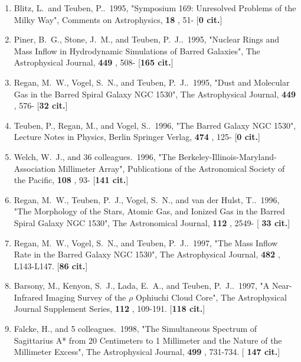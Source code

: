 \documentclass[11pt,letterpaper]{article}
\begin{document}
\begin{enumerate}[resume,label=\textbf{\arabic*}.]
\item  
Blitz, L.~and Teuben, P..\  1995,  "Symposium 169: Unresolved Problems of 
the Milky Way", Comments on Astrophysics,  {\bf 18} , 51- [{\bf 0 cit.}] 

\item  
Piner, B.~G., Stone, J.~M., and Teuben, P.~J..\  1995,  "Nuclear Rings and 
Mass Inflow in Hydrodynamic Simulations of Barred Galaxies", The 
Astrophysical Journal,  {\bf 449} , 508- [{\bf 165 cit.}] 

\item  
Regan, M.~W., Vogel, S.~N., and Teuben, P.~J..\  1995,  "Dust and Molecular 
Gas in the Barred Spiral Galaxy NGC 1530", The Astrophysical Journal,  {\bf 
449} , 576- [{\bf 32 cit.}] 

\item  
Teuben, P., Regan, M., and Vogel, S..\  1996,  "The Barred Galaxy NGC 
1530", Lecture Notes in Physics, Berlin Springer Verlag,  {\bf 474} , 125- 
[{\bf 0 cit.}] 

\item  
Welch, W.~J., and 36 colleagues.\  1996,  "The 
Berkeley-Illinois-Maryland-Association Millimeter Array", Publications of 
the Astronomical Society of the Pacific,  {\bf 108} , 93- [{\bf 141 cit.}] 

\item  
Regan, M.~W., Teuben, P.~J., Vogel, S.~N., and van der Hulst, T..\  1996,  
"The Morphology of the Stars, Atomic Gas, and Ionized Gas in the Barred 
Spiral Galaxy NGC 1530", The Astronomical Journal,  {\bf 112} , 2549- [{\bf 
33 cit.}] 

\item  
Regan, M.~W., Vogel, S.~N., and Teuben, P.~J..\  1997,  "The Mass Inflow 
Rate in the Barred Galaxy NGC 1530", The Astrophysical Journal,  {\bf 482} 
, L143-L147.  [{\bf 86 cit.}] 


\item  
Barsony, M., Kenyon, S.~J., Lada, E.~A., and Teuben, P.~J..\  1997,  "A 
Near-Infrared Imaging Survey of the {$\rho$} Ophiuchi Cloud Core", The 
Astrophysical Journal Supplement Series,  {\bf 112} , 109-191.  [{\bf 118 
cit.}] 

\item  
Falcke, H., and 5 colleagues.\  1998,  "The Simultaneous Spectrum of 
Sagittarius A* from 20 Centimeters to 1 Millimeter and the Nature of the 
Millimeter Excess", The Astrophysical Journal,  {\bf 499} , 731-734.  [{\bf 
147 cit.}] 



\end{enumerate}
\end{document}

